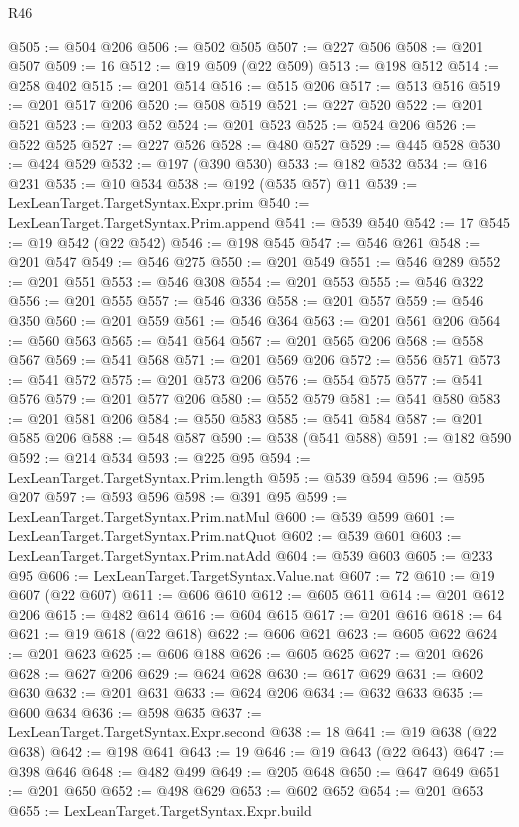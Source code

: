 \begin{lexlean}{R46}
\begin{coremodule}
@505 := @504 @206
@506 := @502 @505
@507 := @227 @506
@508 := @201 @507
@509 := 16
@512 := @19 @509 (@22 @509)
@513 := @198 @512
@514 := @258 @402
@515 := @201 @514
@516 := @515 @206
@517 := @513 @516
@519 := @201 @517 @206
@520 := @508 @519
@521 := @227 @520
@522 := @201 @521
@523 := @203 @52
@524 := @201 @523
@525 := @524 @206
@526 := @522 @525
@527 := @227 @526
@528 := @480 @527
@529 := @445 @528
@530 := @424 @529
@532 := @197 (@390 @530)
@533 := @182 @532
@534 := @16 @231
@535 := @10 @534
@538 := @192 (@535 @57) @11
@539 := LexLeanTarget.TargetSyntax.Expr.prim
@540 := LexLeanTarget.TargetSyntax.Prim.append
@541 := @539 @540
@542 := 17
@545 := @19 @542 (@22 @542)
@546 := @198 @545
@547 := @546 @261
@548 := @201 @547
@549 := @546 @275
@550 := @201 @549
@551 := @546 @289
@552 := @201 @551
@553 := @546 @308
@554 := @201 @553
@555 := @546 @322
@556 := @201 @555
@557 := @546 @336
@558 := @201 @557
@559 := @546 @350
@560 := @201 @559
@561 := @546 @364
@563 := @201 @561 @206
@564 := @560 @563
@565 := @541 @564
@567 := @201 @565 @206
@568 := @558 @567
@569 := @541 @568
@571 := @201 @569 @206
@572 := @556 @571
@573 := @541 @572
@575 := @201 @573 @206
@576 := @554 @575
@577 := @541 @576
@579 := @201 @577 @206
@580 := @552 @579
@581 := @541 @580
@583 := @201 @581 @206
@584 := @550 @583
@585 := @541 @584
@587 := @201 @585 @206
@588 := @548 @587
@590 := @538 (@541 @588)
@591 := @182 @590
@592 := @214 @534
@593 := @225 @95
@594 := LexLeanTarget.TargetSyntax.Prim.length
@595 := @539 @594
@596 := @595 @207
@597 := @593 @596
@598 := @391 @95
@599 := LexLeanTarget.TargetSyntax.Prim.natMul
@600 := @539 @599
@601 := LexLeanTarget.TargetSyntax.Prim.natQuot
@602 := @539 @601
@603 := LexLeanTarget.TargetSyntax.Prim.natAdd
@604 := @539 @603
@605 := @233 @95
@606 := LexLeanTarget.TargetSyntax.Value.nat
@607 := 72
@610 := @19 @607 (@22 @607)
@611 := @606 @610
@612 := @605 @611
@614 := @201 @612 @206
@615 := @482 @614
@616 := @604 @615
@617 := @201 @616
@618 := 64
@621 := @19 @618 (@22 @618)
@622 := @606 @621
@623 := @605 @622
@624 := @201 @623
@625 := @606 @188
@626 := @605 @625
@627 := @201 @626
@628 := @627 @206
@629 := @624 @628
@630 := @617 @629
@631 := @602 @630
@632 := @201 @631
@633 := @624 @206
@634 := @632 @633
@635 := @600 @634
@636 := @598 @635
@637 := LexLeanTarget.TargetSyntax.Expr.second
@638 := 18
@641 := @19 @638 (@22 @638)
@642 := @198 @641
@643 := 19
@646 := @19 @643 (@22 @643)
@647 := @398 @646
@648 := @482 @499
@649 := @205 @648
@650 := @647 @649
@651 := @201 @650
@652 := @498 @629
@653 := @602 @652
@654 := @201 @653
@655 := LexLeanTarget.TargetSyntax.Expr.build

\end{coremodule}
\end{lexlean}
